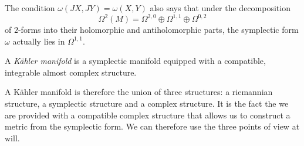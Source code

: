 \documentclass{worksheetclass}
\begin{document}
        The condition $\omega(JX,JY)=\omega(X,Y)$ also says that under the decomposition
        \begin{equation}
            \Omega^2(M) = \Omega^{2,0}\oplus\Omega^{1,1}\oplus\Omega^{0,2}
        \end{equation}
        of $2$-forms into their holomorphic and antiholomorphic parts, the symplectic form $\omega$ actually lies in $\Omega^{1,1}$.
    
        \begin{defn}
            A \emph{Kähler manifold} is a symplectic manifold equipped with a compatible, integrable almost complex structure.
        \end{defn}
        A Kähler manifold is therefore the union of three structures: a riemannian structure, a symplectic structure and a complex structure. It is the fact the we are provided with a compatible complex structure that allows us to construct a metric from the symplectic form. We can therefore use the three points of view at will.
        
\end{document}

